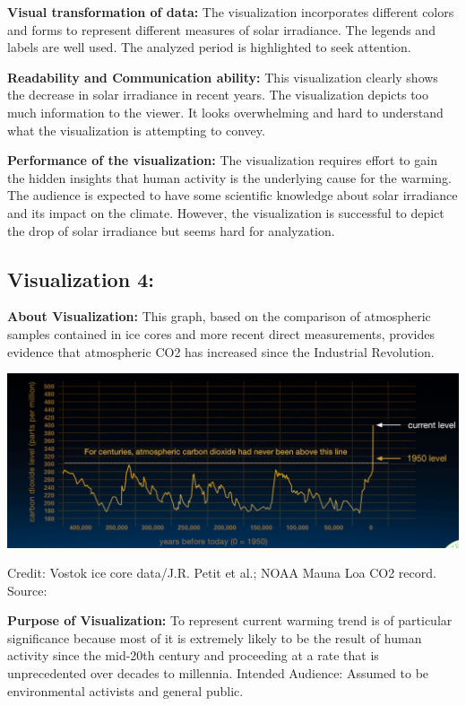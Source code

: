 \documentclass[]{book}
\begin{document}
\textbf{Visual transformation of data:} The visualization incorporates different colors and forms to represent different measures of solar irradiance. The legends and labels are well used. The analyzed period is highlighted to seek attention.

\textbf{Readability and Communication ability:} This visualization clearly shows the decrease in solar irradiance in recent years. The visualization depicts too much information to the viewer. It looks overwhelming and hard to understand what the visualization is attempting to convey.

\textbf{Performance of the visualization:} The visualization requires effort to gain the hidden insights that human activity is the underlying cause for the warming. The audience is expected to have some scientific knowledge about solar irradiance and its impact on the climate. However, the visualization is successful to depict the drop of solar irradiance but seems hard for analyzation.

\hypertarget{visualization-4}{%
\subsection{Visualization 4:}\label{visualization-4}}

\textbf{About Visualization:} This graph, based on the comparison of atmospheric samples contained in ice cores and more recent direct measurements, provides evidence that atmospheric CO2 has increased since the Industrial Revolution.

\includegraphics{images/Vz6-Co2.png}

Credit: Vostok ice core data/J.R. Petit et al.; NOAA Mauna Loa CO2 record.
Source:\citep{Co2}

\textbf{Purpose of Visualization:} To represent current warming trend is of particular significance because most of it is extremely likely to be the result of human activity since the mid-20th century and proceeding at a rate that is unprecedented over decades to millennia.
Intended Audience: Assumed to be environmental activists and general public.
\end{document}
